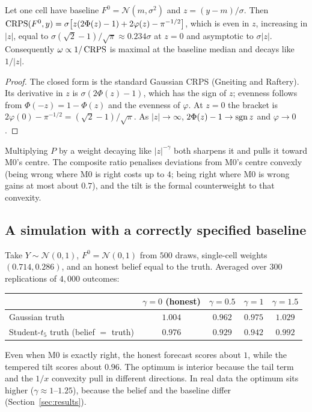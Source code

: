 \begin{proposition}\label{prop:shape}
Let one cell have baseline $F^0=\mathcal N(m,\sigma^2)$ and $z=(y-m)/\sigma$. Then
$\operatorname{CRPS}(F^0,y)=\sigma\bigl[z(2\Phi(z)-1)+2\varphi(z)-\pi^{-1/2}\bigr]$, which is even in $z$, increasing in $|z|$, equal to
$\sigma(\sqrt2-1)/\sqrt\pi\approx0.234\sigma$ at $z=0$ and asymptotic to $\sigma|z|$. Consequently $\omega\propto 1/\operatorname{CRPS}$ is maximal at the baseline
median and decays like $1/|z|$.
\end{proposition}
\begin{proof}
The closed form is the standard Gaussian CRPS (Gneiting and Raftery). Its derivative in $z$ is $\sigma(2\Phi(z)-1)$, which has the sign of $z$;
evenness follows from $\Phi(-z)=1-\Phi(z)$ and the evenness of $\varphi$. At $z=0$ the bracket is $2\varphi(0)-\pi^{-1/2}=(\sqrt2-1)/\sqrt\pi$.
As $|z|\to\infty$, $2\Phi(z)-1\to\operatorname{sgn} z$ and $\varphi\to0$.
\end{proof}
Multiplying $P$ by a weight decaying like $|z|^{-\gamma}$ both sharpens it and pulls it toward M0's centre. The composite ratio penalises
deviations from M0's centre convexly (being wrong where M0 is right costs up to $4$; being right where M0 is wrong gains at most about
$0.7$), and the tilt is the formal counterweight to that convexity.

\subsection{A simulation with a correctly specified baseline}

Take $Y\sim\mathcal N(0,1)$, $F^0=\mathcal N(0,1)$ from $500$ draws, single-cell weights $(0.714,0.286)$, and an honest belief equal to the truth.
Averaged over $300$ replications of $4{,}000$ outcomes:
\begin{center}
\begin{tabular}{lcccc}
\toprule
& $\gamma=0$ (honest) & $\gamma=0.5$ & $\gamma=1$ & $\gamma=1.5$\\
\midrule
Gaussian truth & $1.004$ & $\mathbf{0.962}$ & $0.975$ & $1.029$\\
Student-$t_5$ truth (belief $=$ truth) & $0.976$ & $\mathbf{0.929}$ & $0.942$ & $0.992$\\
\bottomrule
\end{tabular}
\end{center}
Even when M0 is exactly right, the honest forecast scores about $1$, while the tempered tilt scores about $0.96$. The optimum is interior because
the tail term and the $1/x$ convexity pull in different directions. In real data the optimum sits higher ($\gamma\approx1$--$1.25$), because the
belief and the baseline differ (Section~\ref{sec:results}).

